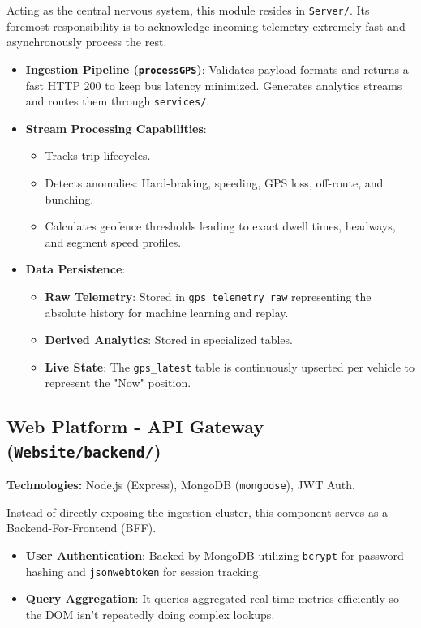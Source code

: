 \documentclass[12pt, a4paper]{article}
\begin{document}
Acting as the central nervous system, this module resides in \texttt{Server/}. Its foremost responsibility is to acknowledge incoming telemetry extremely fast and asynchronously process the rest.
\begin{itemize}
    \item \textbf{Ingestion Pipeline (\texttt{processGPS})}: Validates payload formats and returns a fast HTTP 200 to keep bus latency minimized. Generates analytics streams and routes them through \texttt{services/}.
    \item \textbf{Stream Processing Capabilities}:
    \begin{itemize}
        \item Tracks trip lifecycles.
        \item Detects anomalies: Hard-braking, speeding, GPS loss, off-route, and bunching.
        \item Calculates geofence thresholds leading to exact dwell times, headways, and segment speed profiles.
    \end{itemize}
    \item \textbf{Data Persistence}:
    \begin{itemize}
        \item \textbf{Raw Telemetry}: Stored in \texttt{gps\_telemetry\_raw} representing the absolute history for machine learning and replay.
        \item \textbf{Derived Analytics}: Stored in specialized tables.
        \item \textbf{Live State}: The \texttt{gps\_latest} table is continuously upserted per vehicle to represent the "Now" position.
    \end{itemize}
\end{itemize}

\subsection{Web Platform - API Gateway (\texttt{Website/backend/})}
\textbf{Technologies:} Node.js (Express), MongoDB (\texttt{mongoose}), JWT Auth.

Instead of directly exposing the ingestion cluster, this component serves as a Backend-For-Frontend (BFF).
\begin{itemize}
    \item \textbf{User Authentication}: Backed by MongoDB utilizing \texttt{bcrypt} for password hashing and \texttt{jsonwebtoken} for session tracking.
    \item \textbf{Query Aggregation}: It queries aggregated real-time metrics efficiently so the DOM isn't repeatedly doing complex lookups.
\end{itemize}
\end{document}
